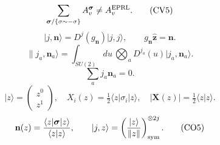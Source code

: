 \documentclass{article}
\newcommand{\ket}[1]{\lvert #1\rangle}
\newcommand{\bra}[1]{\langle #1\rvert}
\begin{document}
\begin{equation}
\sum_{\boldsymbol\sigma/\{\sigma\sim-\sigma\}}A_v^{\boldsymbol\sigma}\ne A_v^{\rm EPRL}.
\tag{CV5}
\end{equation}
\begin{equation}
\ket{j,\mathbf n}=D^j(g_{\mathbf n})\ket{j,j},\qquad g_{\mathbf n}\hat{\mathbf z}=\mathbf n.
\tag{CO1}
\end{equation}
\begin{equation}
\|j_a,\mathbf n_a\rangle=\int_{SU(2)}du\,\bigotimes_aD^{j_a}(u)\ket{j_a,\mathbf n_a}.
\tag{CO2}
\end{equation}
\begin{equation}
\sum_aj_a\mathbf n_a=0.
\tag{CO3}
\end{equation}
\begin{equation}
\ket z=\begin{pmatrix}z^0\\z^1\end{pmatrix},\quad X_i(z)=\tfrac12\bra z\sigma_i\ket z,\quad|\mathbf X(z)|=\tfrac12\langle z|z\rangle.
\tag{CO4}
\end{equation}
\begin{equation}
\mathbf n(z)=\frac{\bra z\boldsymbol\sigma\ket z}{\langle z|z\rangle},\qquad\ket{j,z}=\left(\frac{\ket z}{\|z\|}\right)_{\rm sym}^{\otimes2j}.
\tag{CO5}
\end{equation}
\end{document}
